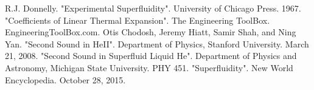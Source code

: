 \documentclass[prb,aps,twocolumn,showpacs,10pt]{revtex4-1}
\begin{document}
\newpage
\begin{references}
 R.J. Donnelly. "Experimental Superfluidity". University of Chicago Press. 1967. 
 "Coefficients of Linear Thermal Expansion". The Engineering ToolBox. EngineeringToolBox.com. 
 Otis Chodosh, Jeremy Hiatt, Samir Shah, and Ning Yan. "Second Sound in HeII". Department of Physics, Stanford University. March 21, 2008.
 "Second Sound in Superfluid Liquid He". Department of Physics and Astronomy, Michigan State University. PHY 451.
 "Superfluidity". New World Encyclopedia. October 28, 2015. 
\end{references}
\end{document}
